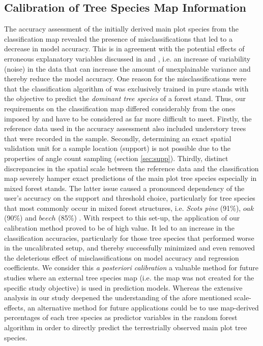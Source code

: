 \subsection{Calibration of Tree Species Map Information}
\label{sec:calib_dis}
The accuracy assessment of the initially derived main plot species from the classification map revealed the presence of misclassifications that led to a decrease in model accuracy. This is in agreement with the potential effects of erroneous explanatory variables discussed in \citet{carroll2006} and \citet{gustafson2003}, i.e. an increase of variability (noise) in the data that can increase the amount of unexplainable variance and thereby reduce the model accuracy. One reason for the misclassifications were that the classification algorithm of \citet{stoffels2015} was exclusively trained in pure stands with the objective to predict the \textit{dominant tree species} of a forest stand. Thus, our requirements on the classification map differed considerably from the ones imposed by \citet{stoffels2015} and have to be considered as far more difficult to meet. Firstly, the reference data used in the accuracy assessment also included understory trees that were recorded in the \bwi{} sample. Secondly, determining an exact spatial validation unit for a sample location (support) is not possible due to the properties of angle count sampling (section \ref{sec:supp}). Thirdly, distinct discrepancies in the spatial scale between the reference data and the classification map severely hamper exact predictions of the main plot tree species especially in mixed forest stands. The latter issue caused a pronounced dependency of the user's accuracy on the support and threshold choice, particularly for tree species that most commonly occur in mixed forest structures, i.e. \textit{Scots pine} (91\%), $oak$ (90\%) and $beech$ (85\%) \citep{bwi3}. With respect to this set-up, the application of our calibration method proved to be of high value. It led to an increase in the classification accuracies, particularly for those tree species that performed worse in the uncalibrated setup, and thereby successfully minimized and even removed the deleterious effect of misclassifications on model accuracy and regression coefficients. We consider this \textit{a posteriori calibration} a valuable method for future studies where an external tree species map (i.e. the map was not created for the specific study objective) is used in prediction models. Whereas the extensive analysis in our study deepened the understanding of the afore mentioned scale-effects, an alternative method for future applications could be to use map-derived percentages of each tree species as predictor variables in the random forest algorithm in order to directly predict the terrestrially observed main plot tree species.


